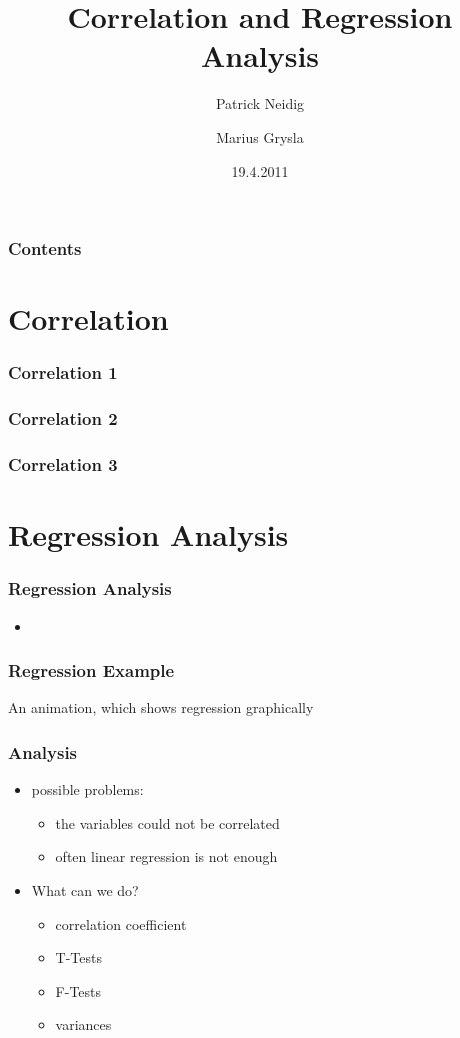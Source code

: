 \documentclass{beamer}
\begin{document}
\title{Correlation and Regression Analysis}
\author{Patrick Neidig \and Marius Grysla}
\date{19.4.2011}
\frame{\titlepage}

\begin{frame}
 \frametitle{Contents}
 \tableofcontents
\end{frame}


\section{Correlation}

\begin{frame}
 \frametitle{Correlation 1}
\end{frame}

\begin{frame}
 \frametitle{Correlation 2}
\end{frame}

\begin{frame}
 \frametitle{Correlation 3}
\end{frame}

\section{Regression Analysis}

\begin{frame}
 \frametitle{Regression Analysis}
 

 \begin{itemize}
  \item 
 \end{itemize}

\end{frame}

\begin{frame}
 \frametitle{Regression Example}

 An animation, which shows regression graphically
\end{frame}

\begin{frame}
 \frametitle{Analysis}
 \begin{itemize}
  \item possible problems:
  \begin{itemize}
   \item the variables could not be correlated
   \item often linear regression is not enough
  \end{itemize}

  \item What can we do?
  \begin{itemize}
   \item correlation coefficient
   \item T-Tests
   \item F-Tests
   \item variances
  \end{itemize}

 \end{itemize}

\end{frame}
\end{document}
